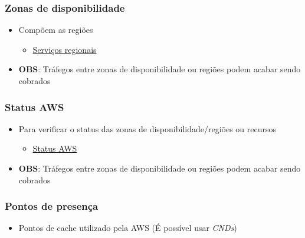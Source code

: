 \begin{frame}
	\frametitle{Zonas de disponibilidade}
	\begin{itemize}
		\item Compõem as regiões
			\begin{itemize}
				\item \href{https://aws.amazon.com/pt/about-aws/global-infrastructure/regional-product-services/}{Serviços regionais}
			\end{itemize}
		\item \textbf{OBS}: Tráfegos entre zonas de disponibilidade ou regiões podem acabar sendo cobrados
	\end{itemize}
\end{frame}

\begin{frame}
	\frametitle{Status AWS}
	\begin{itemize}
		\item Para verificar o status das zonas de disponibilidade/regiões ou recursos
			\begin{itemize}
				\item \href{http://status.aws.amazon.com/}{Status AWS}
			\end{itemize}
		\item \textbf{OBS}: Tráfegos entre zonas de disponibilidade ou regiões podem acabar sendo cobrados
	\end{itemize}
\end{frame}

\begin{frame}
	\frametitle{Pontos de presença}
	\begin{itemize}
		\item Pontos de cache utilizado pela AWS (É possível usar \textit{CNDs})
	\end{itemize}
\end{frame}

